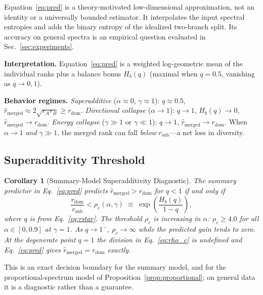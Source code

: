 \documentclass{article}
\newtheorem{corollary}[lemma]{Corollary}
\begin{document}
Equation~\eqref{eq:pred} is a theory-motivated low-dimensional
approximation, not an identity or a universally bounded estimator.  It
interpolates the input spectral entropies and adds the binary entropy of
the idealized two-branch split.  Its accuracy on general spectra is an
empirical question evaluated in Sec.~\ref{sec:experiments}.

\textbf{Interpretation.}
Equation~\eqref{eq:pred} is a weighted log-geometric mean of the
individual ranks plus a balance bonus $H_b(q)$ (maximal when
$q{=}0.5$, vanishing as $q{\to}0,1$).

\textbf{Behavior regimes.}
\emph{Superadditive} ($\alpha{\approx}0$, $\gamma{\approx}1$): $q{\approx}0.5$,
$\hat{r}_{\mathrm{merged}}{\approx}2\sqrt{r_Ar_B}\geq r_{\mathrm{dom}}$.
\emph{Directional collapse} ($\alpha{\to}1$): $q{\to}1$, $H_b(q){\to}0$,
$\hat{r}_{\mathrm{merged}}{\to}r_{\mathrm{dom}}$.
\emph{Energy collapse} ($\gamma{\gg}1$ or $\gamma{\ll}1$): $q{\to}1$,
$\hat{r}_{\mathrm{merged}}{\to}r_{\mathrm{dom}}$.
When $\alpha{\to}1$ \emph{and} $\gamma{\gg}1$, the merged rank can fall
\emph{below} $r_{\mathrm{sub}}$---a net loss in diversity.

\subsection{Superadditivity Threshold}
\label{sec:superadd}

\begin{corollary}[Summary-Model Superadditivity Diagnostic]
\label{cor:superadd}
The summary predictor in Eq.~\eqref{eq:pred} predicts
$\hat{r}_{\mathrm{merged}}>r_{\mathrm{dom}}$
for $q<1$ if and only if
\begin{equation}
  \frac{r_{\mathrm{dom}}}{r_{\mathrm{sub}}} < \rho_c(\alpha,\gamma)
  \;\equiv\; \exp\!\!\left(\frac{H_b(q)}{1-q}\right),
  \label{eq:rho_c}
\end{equation}
where $q$ is from Eq.~\eqref{eq:rstar}.
The threshold $\rho_c$ is increasing in $\alpha$:
$\rho_c\geq4.0$ for all $\alpha\in[0,0.9]$ at $\gamma=1$.
As $q\to1^{-}$, $\rho_c\to\infty$ while the predicted gain tends to zero.
At the degenerate point $q=1$ the division in Eq.~\eqref{eq:rho_c} is
undefined and Eq.~\eqref{eq:pred} gives
$\hat r_{\mathrm{merged}}=r_{\mathrm{dom}}$ exactly.
\end{corollary}

This is an exact decision boundary for the summary model, and for the
proportional-spectrum model of Proposition~\ref{prop:proportional}; on
general data it is a diagnostic rather than a guarantee.
\end{document}
